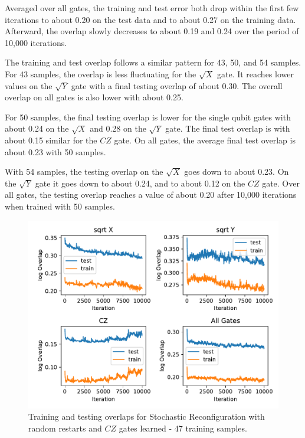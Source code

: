 Averaged over all gates, the training and test error both drop within the first few iterations to about 
0.20 on the test data and to about 0.27 on the training data. Afterward, the overlap slowly decreases to about 0.19 and 
0.24 over the period of 10,000 iterations.

The training and test overlap follows a similar pattern for 43, 50, and 54 samples. For 43 samples, the 
overlap is less fluctuating for the $\sqrt{X}$ gate. It reaches lower values on the $\sqrt{Y}$ gate with 
a final testing overlap of about 0.30. The overall overlap on all gates is also lower with about 0.25.

For 50 samples, the final testing overlap is lower for the single qubit gates with about 0.24 on the $\sqrt{X}$
and 0.28 on the $\sqrt{Y}$ gate. The final test overlap is with about 0.15 similar for the $CZ$ gate. On all gates, 
the average final test overlap is about 0.23 with 50 samples.

With 54 samples, the testing overlap on the $\sqrt{X}$ goes down to about 0.23. On the $\sqrt{Y}$ gate it goes 
down to about 0.24, and to about 0.12 on the $CZ$ gate. Over all gates, the testing overlap reaches a value of about 
0.20 after 10,000 iterations when trained with 50 samples.

\begin{figure}[H]
  \centering
  \includegraphics[width=\textwidth]{figures/results/sr-restarts-learned/avgOverlap_47.pdf}
  \caption[Training and Testing Overlaps for Stochastic Reconfiguration with Random Restarts and $CZ$ Gates Learned - 47 Samples]{
  Training and testing overlaps for Stochastic Reconfiguration with random restarts and $CZ$ gates learned - 47 training samples.}
  \label{fig:sr_restarts_overlap_47}
\end{figure}


